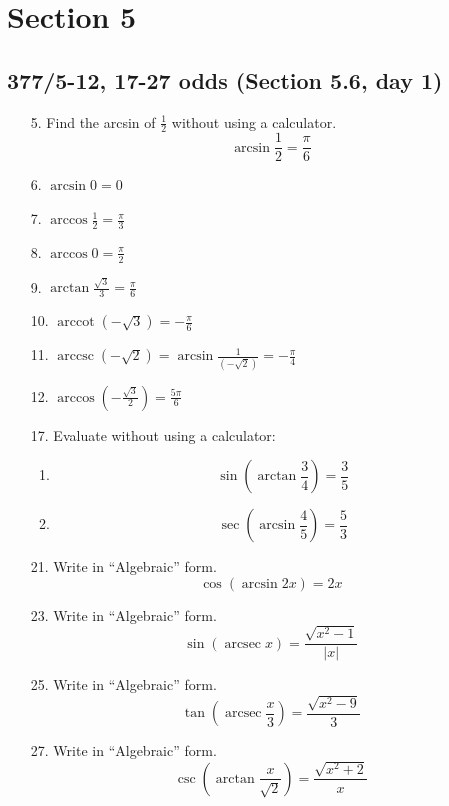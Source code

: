 \documentclass[11pt]{article}
\DeclareMathOperator{\arcsec}{arcsec}
\DeclareMathOperator{\arccot}{arccot}
\DeclareMathOperator{\arccsc}{arccsc}
\begin{document}
\section{Section 5}
\subsection{377/5-12, 17-27 odds (Section 5.6, day 1)}
\begin{enumerate}
	\item[5. ] Find the arcsin of $\frac{1}{2}$ without using a calculator.
		$$\arcsin \frac{1}{2} = \frac{\pi}{6}$$
	\item[6. ]  $\arcsin 0 = 0$
	\item[7. ]  $\arccos \frac{1}{2} = \frac{\pi}{3}$
	\item[8. ]  $\arccos 0 = \frac{\pi}{2}$
	\item[9. ]  $\arctan \frac{\sqrt{3}}{3} = \frac{\pi}{6}$
	\item[10. ] $\arccot (-\sqrt{3}) = -\frac{\pi}{6}$
	\item[11. ] $\arccsc \left(-\sqrt{2}\right) = \arcsin \frac{1}{(-\sqrt{2})} 
		= -\frac{\pi}{4}$
	\item[12. ] $\arccos \left(-\frac{\sqrt{3}}{2}\right) = \frac{5\pi}{6}$
	\item[17. ] Evaluate without using a calculator:
		\begin{enumerate}
			\item \[\sin \left(\arctan \frac{3}{4}\right) = \frac{3}{5}\]
			\item \[\sec \left(\arcsin \frac{4}{5}\right) = \frac{5}{3}\]
		\end{enumerate}
	\item[21. ] Write in ``Algebraic'' form.
		\[\cos \left(\arcsin 2x\right) = 2x\]
	\item[23. ] Write in ``Algebraic'' form. 
		\[\sin (\arcsec x) = \frac{\sqrt{x^2 - 1}}{|x|}\]
	\item[25. ] Write in ``Algebraic'' form.
		\[\tan\left(\arcsec\frac{x}{3}\right) = \frac{\sqrt{x^2-9}}{3}\]
	\item[27. ] Write in ``Algebraic'' form.
		\[\csc\left(\arctan \frac{x}{\sqrt{2}}\right) = \frac{\sqrt{x^2+2}}{x}\]
	\end{enumerate}
\end{document}
